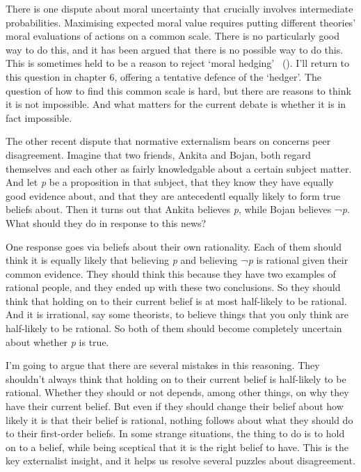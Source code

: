 \documentclass[
  10pt,
  letterpaper,
  twoside]{scrbook}
\begin{document}
There is one dispute about moral uncertainty that crucially involves
intermediate probabilities. Maximising expected moral value requires
putting different theories' moral evaluations of actions on a common
scale. There is no particularly good way to do this, and it has been
argued that there is no possible way to do this. This is sometimes held
to be a reason to reject `moral hedging'
~(). I'll return to this question
in chapter 6, offering a tentative defence of the `hedger'. The question
of how to find this common scale is hard, but there are reasons to think
it is not impossible. And what matters for the current debate is whether
it is in fact impossible.

The other recent dispute that normative externalism bears on concerns
peer disagreement. Imagine that two friends, {Ankita} and {Bojan}, both
regard themselves and each other as fairly knowledgable about a certain
subject matter. And let \emph{p} be a proposition in that subject, that
they know they have equally good evidence about, and that they are
antecedentl equally likely to form true beliefs about. Then it turns out
that {Ankita} believes \emph{p}, while {Bojan} believes ¬\emph{p}. What
should they do in response to this news?

One response goes via beliefs about their own rationality. Each of them
should think it is equally likely that believing \emph{p} and believing
¬\emph{p} is rational given their common evidence. They should think
this because they have two examples of rational people, and they ended
up with these two conclusions. So they should think that holding on to
their current belief is at most half-likely to be rational. And it is
irrational, say some theorists, to believe things that you only think
are half-likely to be rational. So both of them should become completely
uncertain about whether \emph{p} is true.

I'm going to argue that there are several mistakes in this reasoning.
They shouldn't always think that holding on to their current belief is
half-likely to be rational. Whether they should or not depends, among
other things, on why they have their current belief. But even if they
should change their belief about how likely it is that their belief is
rational, nothing follows about what they should do to their first-order
beliefs. In some strange situations, the thing to do is to hold on to a
belief, while being sceptical that it is the right belief to have. This
is the key externalist insight, and it helps us resolve several puzzles
about disagreement.
\end{document}
